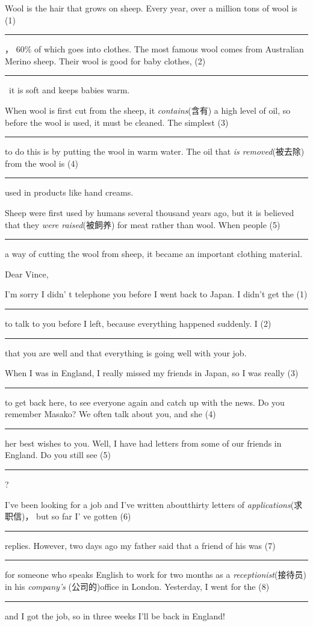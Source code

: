 \documentclass{article}
\newcommand{\kong}{\rule{4em}{0.5pt} }
\begin{document}
\begin{center}
\end{center}

Wool is the hair that grows on sheep. Every year, over a million tons of 
wool is (1)\kong ， 60{\%} of which goes into clothes. 
The most famous wool comes from Australian Merino sheep. Their wool is good 
for baby clothes, (2)\kong \ it is soft and keeps 
babies warm.

When wool is first cut from the sheep, it \textit{contains}\/(含有) a high level of oil, so 
before the wool is used, it must be cleaned. The simplest 
(3)\kong to do this is by putting the wool in warm 
water. The oil that \textit{is removed}\/(被去除) from the wool is (4)\kong  
used in products like hand creams.

Sheep were first used by humans several thousand years ago, but it is 
believed that they \textit{were raised}\/(被飼养) for meat rather than wool. When people (5) 
\kong  a way of cutting the wool from sheep, it became an 
important clothing material.

\begin{center}
\end{center}

Dear Vince,

I'm sorry I didn' t telephone you before I went back to Japan. I didn't get 
the (1)\kong  to talk to you before I left, because everything 
happened suddenly. I (2)\kong  that you are well and 
that everything is going well with your job.

When I was in England, I really missed my friends in Japan, so I was really 
(3)\kong to get back here, to see everyone again and catch up with 
the news. Do you remember Masako? We often talk about you, and she 
(4)\kong her best wishes to you. Well, I have had 
letters from some of our friends in England. Do you still see 
(5)\kong ?

I've been looking for a job and I've written aboutthirty letters of 
\textit{applications}\/(求职信)， but so far I' ve gotten (6)\kong  
replies. However, two days ago my father said that a friend of his was 
(7)\kong  for someone who speaks English to work for two 
months as a \textit{receptionist}\/(接待员) in his \textit{company's} (公司的)office in London. Yesterday, I went for 
the (8)\kong and I got the job, so in 
three weeks I'll be back in England!
\end{document}
